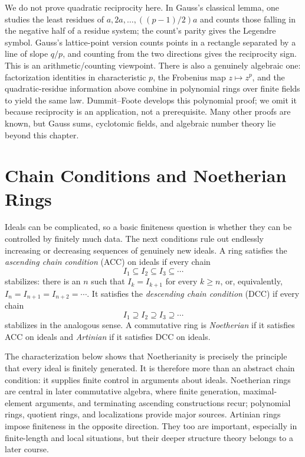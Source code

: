 \begin{remark}
We do not prove quadratic reciprocity here.  In Gauss's classical lemma, one
studies the least residues of \(a,2a,\ldots,((p-1)/2)a\) and counts those
falling in the negative half of a residue system; the count's parity gives
the Legendre symbol.  Gauss's lattice-point version counts points in a
rectangle separated by a line of slope \(q/p\), and counting from the two
directions gives the reciprocity sign.  This is an arithmetic/counting
viewpoint.  There is also a genuinely algebraic one: factorization identities
in characteristic \(p\), the Frobenius map \(z\mapsto z^p\), and the
quadratic-residue information above combine in polynomial rings over finite
fields to yield the same law.  Dummit--Foote develops this polynomial proof;
we omit it because reciprocity is an application, not a prerequisite.  Many
other proofs are known, but Gauss sums, cyclotomic fields, and algebraic
number theory lie beyond this chapter.
\end{remark}

\section{Chain Conditions and Noetherian Rings}
Ideals can be complicated, so a basic finiteness question is whether they can
be controlled by finitely much data.  The next conditions rule out endlessly
increasing or decreasing sequences of genuinely new ideals.  A ring
satisfies the \emph{ascending chain condition} (ACC) on ideals if every chain
\[
I_1\subseteq I_2\subseteq I_3\subseteq\cdots
\]
stabilizes: there is an \(n\) such that \(I_k=I_{k+1}\) for every \(k\ge n\),
or, equivalently, \(I_n=I_{n+1}=I_{n+2}=\cdots\).  It satisfies the
\emph{descending chain condition} (DCC) if every chain
\[
I_1\supseteq I_2\supseteq I_3\supseteq\cdots
\]
stabilizes in the analogous sense.  A commutative ring is \emph{Noetherian}
if it satisfies ACC on ideals and \emph{Artinian} if it satisfies DCC on
ideals.

The characterization below shows that Noetherianity is precisely the
principle that every ideal is finitely generated.  It is therefore more than
an abstract chain condition: it supplies finite control in arguments about
ideals.  Noetherian rings are central in later commutative algebra, where
finite generation, maximal-element arguments, and terminating ascending
constructions recur; polynomial rings, quotient rings, and localizations
provide major sources.  Artinian rings impose finiteness in the opposite
direction.  They too are important, especially in finite-length and local
situations, but their deeper structure theory belongs to a later course.

